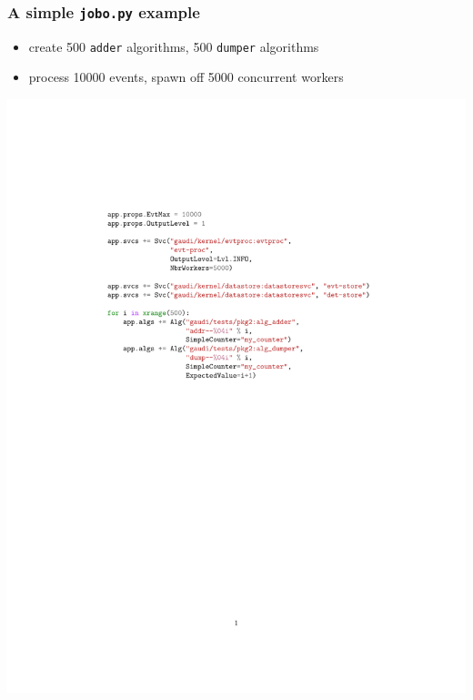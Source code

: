 \documentclass[bigger]{beamer}
\begin{document}
\begin{frame}
\frametitle{A simple \verb~jobo.py~ example}
\label{sec-1-18}


\begin{itemize}
\item create 500 \verb~adder~ algorithms,  500 \verb~dumper~ algorithms
\item process 10000 events, spawn off 5000 concurrent workers
\end{itemize}

\includegraphics[width=.9\linewidth]{figs/big-jobo.pdf}
\end{frame}
\end{document}
